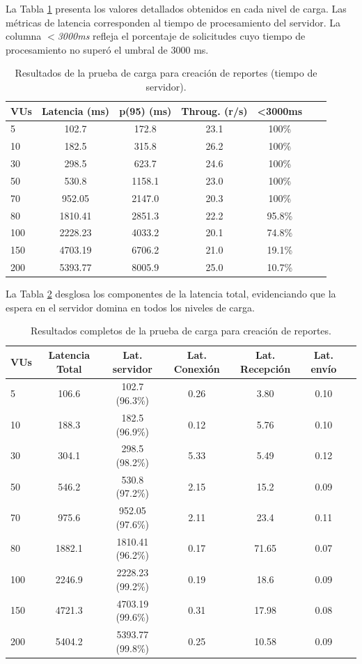 La Tabla \ref{tab:anexo-creacion} presenta los valores detallados obtenidos en cada nivel de carga. 
Las métricas de latencia corresponden al tiempo de procesamiento del servidor. 
La columna \textit{$<$3000ms} refleja el porcentaje de solicitudes cuyo tiempo de procesamiento no superó el umbral de 3000 ms.


\begin{table}[H]
\centering
\caption{Resultados de la prueba de carga para creación de reportes (tiempo de servidor).}
\label{tab:anexo-creacion}
\footnotesize
\begin{tabular}{lcccccc}
\hline
\textbf{VUs} & \textbf{Latencia (ms)} & \textbf{p(95) (ms)}  & \textbf{Throug. (r/s)}  & \textbf{<3000ms} \\
\hline
5   & 102.7  & 172.8      & 23.1 & 100\% \\
10  & 182.5  & 315.8     & 26.2 & 100\% \\
30  & 298.5   & 623.7   & 24.6 & 100\% \\
50  & 530.8  & 1158.1   &23.0 & 100\% \\
70  & 952.05  & 2147.0    &20.3 & 100\% \\
80  & 1810.41 & 2851.3    &22.2 & 95.8\% \\
100 & 2228.23 & 4033.2    &20.1 & 74.8\% \\
150 & 4703.19 & 6706.2    &21.0 & 19.1\% \\
200 & 5393.77 & 8005.9   &25.0 & 10.7\% \\
\hline
\end{tabular}
\end{table}

La Tabla \ref{tab:anexo-creacion-componentes} desglosa los componentes de la latencia total, evidenciando que la espera en el servidor domina en todos los niveles de carga.

\begin{table}[H]
\centering
\caption{Resultados completos de la prueba de carga para creación de reportes.}
\label{tab:anexo-creacion-componentes}
\footnotesize
\begin{tabular}{lcccccc}
\hline
\textbf{VUs} & \textbf{Latencia Total} &  \textbf{Lat. servidor} & \textbf{Lat. Conexión}  & \textbf{Lat. Recepción} & \textbf{Lat. envío}   \\
\hline
5   & 106.6   & 102.7 (96.3\%) & 0.26 & 3.80 & 0.10   \\
10  & 188.3   & 182.5 (96.9\%) & 0.12 & 5.76 & 0.10 \\
30  & 304.1    & 298.5 (98.2\%) & 5.33 & 5.49 & 0.12\\
50  & 546.2    & 530.8 (97.2\%) & 2.15 & 15.2 & 0.09 \\
70  & 975.6    & 952.05 (97.6\%) & 2.11 & 23.4 & 0.11\\
80  & 1882.1   & 1810.41 (96.2\%) & 0.17 & 71.65 & 0.07 \\
100 & 2246.9   & 2228.23 (99.2\%) & 0.19 & 18.6 & 0.09\\
150 & 4721.3   & 4703.19 (99.6\%) & 0.31 & 17.98 & 0.08 \\
200 & 5404.2  & 5393.77 (99.8\%) & 0.25 & 10.58 & 0.09\\
\hline
\end{tabular}
\end{table}

